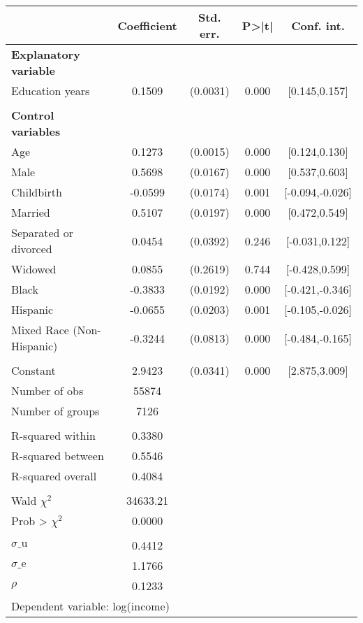 {
\def\sym#1{\ifmmode^{#1}\else\(^{#1}\)\fi}
\begin{tabular}{l*{1}{cccc}}
\toprule
                    & Coefficient&   Std. err.&       P>|t|&  Conf. int.\\
\midrule
\textbf{Explanatory variable}&            &            &            &            \\
Education years     &      0.1509&    (0.0031)&       0.000&[0.145,0.157]\\
\\ \textbf{Control variables}&            &            &            &            \\
Age                 &      0.1273&    (0.0015)&       0.000&[0.124,0.130]\\
Male                &      0.5698&    (0.0167)&       0.000&[0.537,0.603]\\
Childbirth          &     -0.0599&    (0.0174)&       0.001&[-0.094,-0.026]\\
Married             &      0.5107&    (0.0197)&       0.000&[0.472,0.549]\\
Separated or divorced&      0.0454&    (0.0392)&       0.246&[-0.031,0.122]\\
Widowed             &      0.0855&    (0.2619)&       0.744&[-0.428,0.599]\\
Black               &     -0.3833&    (0.0192)&       0.000&[-0.421,-0.346]\\
Hispanic            &     -0.0655&    (0.0203)&       0.001&[-0.105,-0.026]\\
Mixed Race (Non-Hispanic)&     -0.3244&    (0.0813)&       0.000&[-0.484,-0.165]\\
                    &            &            &            &            \\
Constant            &      2.9423&    (0.0341)&       0.000&[2.875,3.009]\\
\midrule
Number of obs       &       55874&            &            &            \\
Number of groups    &        7126&            &            &            \\
\\ R-squared within &      0.3380&            &            &            \\
R-squared between   &      0.5546&            &            &            \\
R-squared overall   &      0.4084&            &            &            \\
\\ Wald $\chi^2$    &    34633.21&            &            &            \\
Prob > $\chi^2$     &      0.0000&            &            &            \\
\\ $\sigma\text{\_u}$&      0.4412&            &            &            \\
$\sigma\text{\_e}$   &      1.1766&            &            &            \\
$\rho$              &      0.1233&            &            &            \\
\bottomrule
\multicolumn{5}{l}{\footnotesize Dependent variable: log(income)}\\
\end{tabular}
}
